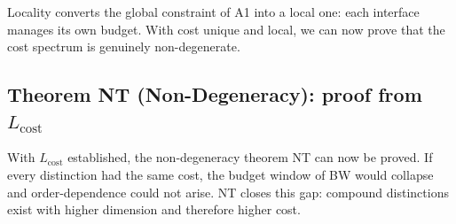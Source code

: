 \documentclass[11pt]{article}
\theoremstyle{remark}
\begin{document}
\smallskip\noindent Locality converts the global constraint of A1 into a local one: each interface manages its own budget.  With cost unique and local, we can now prove that the cost spectrum is genuinely non-degenerate.


\subsection{Theorem NT (Non-Degeneracy): proof from $L_{\mathrm{cost}}$}
\label{sec:NT_proof}

With $L_{\mathrm{cost}}$ established, the non-degeneracy theorem NT can now be proved.  If every distinction had the same cost, the budget window of BW would collapse and order-dependence could not arise.  NT closes this gap: compound distinctions exist with higher dimension and therefore higher cost.
\end{document}
